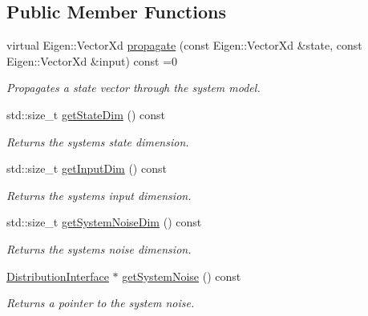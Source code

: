 \subsection*{Public Member Functions}
\begin{DoxyCompactItemize}
\item 
virtual Eigen\+::\+Vector\+Xd \hyperlink{classrefill_1_1SystemModelBase_a92d2c65291b3086f810e362cf4194eb0}{propagate} (const Eigen\+::\+Vector\+Xd \&state, const Eigen\+::\+Vector\+Xd \&input) const =0
\begin{DoxyCompactList}\small\item\em Propagates a state vector through the system model. \end{DoxyCompactList}\item 
std\+::size\+\_\+t \hyperlink{classrefill_1_1SystemModelBase_a56128ef3ffd3a0f4fb5ebaa543b5f719}{get\+State\+Dim} () const 
\begin{DoxyCompactList}\small\item\em Returns the systems state dimension. \end{DoxyCompactList}\item 
std\+::size\+\_\+t \hyperlink{classrefill_1_1SystemModelBase_ada4237797b93bf1da249edd2c4ec91a2}{get\+Input\+Dim} () const 
\begin{DoxyCompactList}\small\item\em Returns the systems input dimension. \end{DoxyCompactList}\item 
std\+::size\+\_\+t \hyperlink{classrefill_1_1SystemModelBase_aef4177aef8fba2c5a7c0c749c88d1c66}{get\+System\+Noise\+Dim} () const 
\begin{DoxyCompactList}\small\item\em Returns the systems noise dimension. \end{DoxyCompactList}\item 
\hyperlink{classrefill_1_1DistributionInterface}{Distribution\+Interface} $\ast$ \hyperlink{classrefill_1_1SystemModelBase_a2f733310da14248ab7f5a41840eb88b7}{get\+System\+Noise} () const 
\begin{DoxyCompactList}\small\item\em Returns a pointer to the system noise. \end{DoxyCompactList}\end{DoxyCompactItemize}
